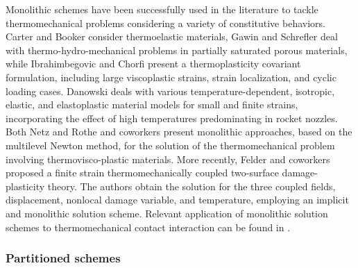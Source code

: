 Monolithic schemes have been successfully  used in the literature to tackle thermomechanical problems considering a variety of constitutive behaviors.
Carter and Booker \citep{carter_finite_1989} consider thermoelastic materials, Gawin and Schrefler \citep{gawinThermoHydroMechanical1996} deal with thermo-hydro-mechanical problems in partially saturated porous materials, while Ibrahimbegovic and Chorfi \citep{ibrahimbegovic_covariant_2002} present a thermoplasticity covariant formulation, including large viscoplastic strains, strain localization, and cyclic loading cases.
Danowski \citep{danowski_computational_2014} deals with various temperature-dependent, isotropic, elastic, and elastoplastic material models for small and finite strains, incorporating the effect of high temperatures predominating in rocket nozzles.
Both Netz \citep{netz_high-order_2013} and Rothe and coworkers \citep{rothe_monolithic_2015} present monolithic approaches, based on the multilevel Newton method, for the solution of the thermomechanical problem involving thermovisco-plastic materials.
More recently, Felder and coworkers \citep{felder_thermomechanically_2021} proposed a finite strain thermomechanically coupled two-surface damage-plasticity theory.
The authors obtain the solution for the three coupled fields, displacement, nonlocal damage variable, and temperature, employing an implicit and monolithic solution scheme.
Relevant application of monolithic solution schemes to thermomechanical contact interaction can be found in \citet{zavarise1992RealContactMechanisms,wriggers1993ThermomechanicalContactRigorous,oancea1997FiniteElementFormulation,hueber2009ThermomechanicalContactProblems,dittmann2014IsogeometricAnalysisThermomechanical,seitz2018ComputationalApproachThermoelastoplastic}.

\subsubsection{Partitioned schemes}
\label{sec:partitioned-schemes}

